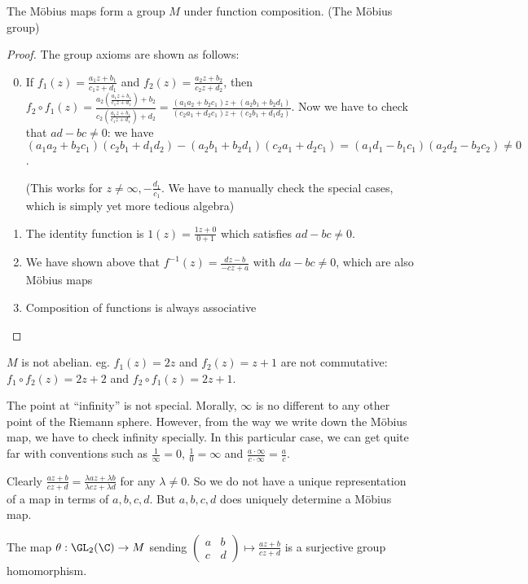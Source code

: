 \documentclass[a4paper]{article}
\begin{document}
\begin{prop}
  The M\"obius maps form a group $M$ under function composition. (The M\"obius group)
\end{prop}
\begin{proof}
  The group axioms are shown as follows:
  \begin{enumerate}[label=\arabic{*}.]
      \setcounter{enumi}{-1}
    \item If $f_1(z) = \frac{a_1z + b_1}{c_1z + d_1}$ and $f_2(z) = \frac{a_2z + b_2}{c_2 z + d_2}$, then $\displaystyle f_2\circ f_1 (z) = \frac{a_2\left(\frac{a_1z + b_1}{c_1z + d_1}\right) + b_2}{c_2\left(\frac{a_1z + b_1}{c_1z + d_1}\right) + d_2} = \frac{(a_1a_2 + b_2c_1)z + (a_2b_1 + b_2d_1)}{(c_2a_1 + d_2c_1)z + (c_2b_1 + d_1d_2)}$. Now we have to check that $ad - bc \not = 0$: we have $(a_1a_2 + b_2c_1)(c_2b_1 + d_1d_2) - (a_2b_1 + b_2d_1)(c_2a_1 + d_2c_1) = (a_1d_1 - b_1c_1)(a_2d_2 - b_2c_2)\not =0 $.

      (This works for $z\not= \infty, -\frac{d_1}{c_1}$. We have to manually check the special cases, which is simply yet more tedious algebra)
    \item The identity function is $1(z) = \frac{1z + 0}{0 + 1}$ which satisfies $ad - bc \not= 0$.
    \item We have shown above that $f^{-1}(z) = \frac{dz - b}{-cz + a}$ with $da - bc\not= 0$, which are also M\"obius maps
    \item Composition of functions is always associative
  \end{enumerate}
\end{proof}
\note $M$ is not abelian. eg. $f_1(z) = 2z$ and $f_2(z) = z + 1$ are not commutative: $f_1\circ f_2(z) = 2z+2$ and $f_2\circ f_1(z) = 2z + 1$.

\note The point at ``infinity'' is not special. Morally, $\infty$ is no different to any other point of the Riemann sphere. However, from the way we write down the M\"obius map, we have to check infinity specially. In this particular case, we can get quite far with conventions such as $\frac{1}{\infty} = 0$, $\frac{1}{0} = \infty$ and $\frac{a\cdot \infty}{c\cdot \infty} = \frac{a}{c}$.

Clearly $\frac{az + b}{cz + d} = \frac{\lambda az + \lambda b}{\lambda cz + \lambda d}$ for any $\lambda \not= 0$. So we do not have a unique representation of a map in terms of $a, b, c, d$. But $a, b, c, d$ does uniquely determine a M\"obius map.

\begin{prop}
  The map $\theta: \GL_2(\C)\to M$ sending $
  \displaystyle \begin{pmatrix}
    a & b\\
    c & d
  \end{pmatrix} \mapsto \frac{az + b}{cz + d}$ is a surjective group homomorphism.
\end{prop}
\end{document}
